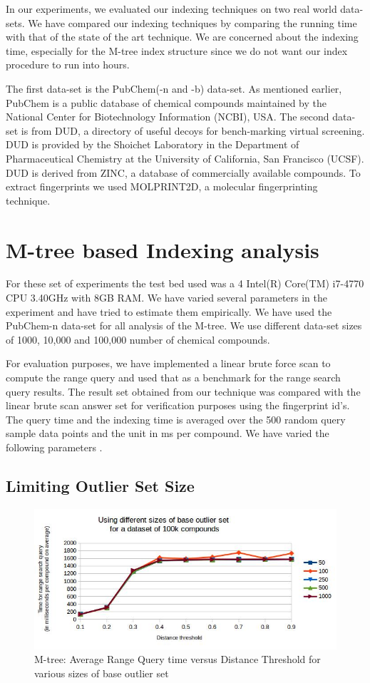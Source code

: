 
In our experiments, we evaluated our indexing techniques on two real world data-sets. We have compared our indexing techniques by comparing the running time with that of the state of the art technique. We are concerned about the indexing time, especially for the M-tree index structure since we do not want our index procedure to run into hours.

The first data-set is the PubChem(-n and -b) data-set. As mentioned earlier, PubChem is a public database of chemical compounds maintained by the National Center for Biotechnology Information (NCBI), USA. The second data-set is from DUD, a directory of useful decoys for bench-marking virtual screening. DUD is provided by the Shoichet Laboratory in the Department of Pharmaceutical Chemistry at the University of California, San Francisco (UCSF). DUD is derived from ZINC, a database of commercially available compounds. To extract fingerprints we used MOLPRINT2D, a molecular fingerprinting technique.


\section{M-tree based Indexing analysis}	

For these set of experiments the test bed used was a 4 Intel(R) Core(TM) i7-4770 CPU \@ 3.40GHz with 8GB RAM. We have varied several parameters in the experiment and have tried to estimate them empirically. We have used the PubChem-n data-set for all analysis of the M-tree. We use different data-set sizes of 1000, 10,000 and 100,000 number of chemical compounds.

For evaluation purposes, we have implemented a linear brute force scan to compute the range query and used that as a benchmark for the range search query results. The result set obtained from our technique was compared with the linear brute scan answer set for verification purposes using the fingerprint id's. The query time and the indexing time is averaged over the 500 random query sample data points and the unit in ms per compound. We have varied the following parameters .


\subsection{Limiting Outlier Set Size }

\begin{figure}[ht]	
\centering
\includegraphics[width=1 \columnwidth]{img/image1.jpg}
\caption{M-tree: Average Range Query time versus Distance Threshold for various sizes of base outlier set}
\label{fig:5.1}
\end{figure}

